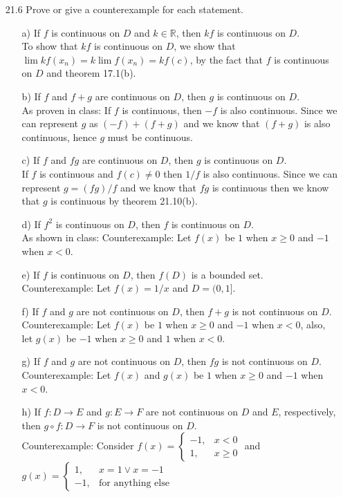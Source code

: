 \documentclass[12pt]{article}
\begin{document}
\begin{enumerate}
\item[21.6] Prove or give a counterexample for each statement.
\begin{enumerate}
\item[a)] If $f$ is continuous on $D$ and $k \in \mathbb{R}$, then $kf$ is continuous on $D$. \\
To show that $kf$ is continuous on $D$, we show that 
$\lim kf(x_n) = k \lim f(x_n) = kf(c)$, by the fact that $f$ is continuous on $D$
and theorem 17.1(b).
\item[b)] If $f$ and $f + g$ are continuous on $D$, then $g$ is continuous on $D$. \\
As proven in class: If $f$ is continuous, then $-f$ is also continuous. Since
we can represent $g$ as $(-f) + (f + g)$ and we know that $(f + g)$ is also continuous,
hence $g$ must be continuous.
\item[c)] If $f$ and $fg$ are continuous on $D$, then $g$ is continuous on $D$. \\
If $f$ is continuous and $f(c) \neq 0$ then $1/f$ is also continuous. Since
we can represent $g = (fg)/f$ and we know that $fg$ is continuous then we know that
$g$ is continuous by theorem 21.10(b).
\item[d)] If $f^2$ is continuous on $D$, then $f$ is continuous on $D$. \\
As shown in class: Counterexample: Let $f(x)$ be $1$ when $x \geq 0$ and 
$-1$ when $x < 0$.
\item[e)] If $f$ is continuous on $D$, then $f(D)$ is a bounded set. \\
Counterexample: Let $f(x) = 1/x$ and $D = (0, 1]$.
\item[f)] If $f$ and $g$ are not continuous on $D$, then $f+g$ is not continuous on $D$. \\
Counterexample: Let $f(x)$ be $1$ when $x \geq 0$ and 
$-1$ when $x < 0$, also, let $g(x)$ be $-1$ when $x \geq 0$ and 
$1$ when $x < 0$.
\item[g)] If $f$ and $g$ are not continuous on $D$, then $fg$ is not continuous on $D$. \\
Counterexample: Let $f(x)$ and $g(x)$ be $1$ when $x \geq 0$ and 
$-1$ when $x < 0$.
\item[h)] If $f: D \rightarrow E$ and $g: E \rightarrow F$ are not continuous on $D$ and $E$, respectively, then $g \circ f : D \rightarrow F$ is not continuous on $D$. \\
Counterexample: Consider $ f(x) = 
\begin{cases}
-1, & x < 0 \\
1, & x \geq 0
\end{cases}
$ \quad and \\ 
$g(x) = 
\begin{cases}
1, & x = 1 \vee x = -1 \\
-1, & \mbox{for anything else} 
\end{cases}
$
\end{enumerate}


\end{enumerate}
\end{document}
